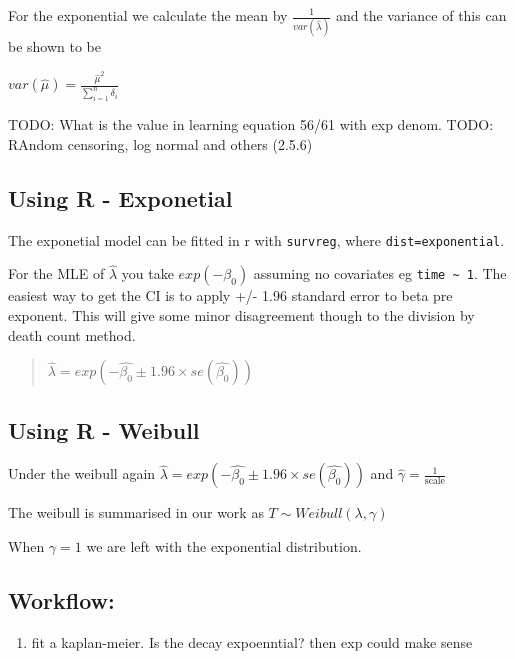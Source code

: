 \documentclass[
  letterpaper,
  DIV=11,
  numbers=noendperiod]{scrreprt}
\providecommand{\tightlist}{%
  \setlength{\itemsep}{0pt}\setlength{\parskip}{0pt}}\usepackage{longtable,booktabs,array}
\begin{document}
For the exponential we calculate the mean by
\(\frac{1}{var(\hat{\lambda})}\) and the variance of this can be shown
to be

\(var(\hat{\mu}) = \frac{\hat{\mu}^2}{\sum_{i=1}^n \delta_i}\)

TODO: What is the value in learning equation 56/61 with exp denom. TODO:
RAndom censoring, log normal and others (2.5.6)

\hypertarget{using-r---exponetial}{%
\subsection{Using R - Exponetial}\label{using-r---exponetial}}

The exponetial model can be fitted in r with \texttt{survreg}, where
\texttt{dist=\textquotesingle{}exponential\textquotesingle{}}.

For the MLE of \(\hat{\lambda}\) you take \(exp(-\beta_0)\) assuming no
covariates eg \texttt{time\ \textasciitilde{}\ 1}. The easiest way to
get the CI is to apply +/- 1.96 standard error to beta pre exponent.
This will give some minor disagreement though to the division by death
count method.

\begin{quote}
\(\hat{\lambda} = exp(-\hat{\beta_0} \pm 1.96\times se(\hat{\beta_0}))\)
\end{quote}

\hypertarget{using-r---weibull}{%
\subsection{Using R - Weibull}\label{using-r---weibull}}

Under the weibull again
\(\hat{\lambda} = exp(-\hat{\beta_0} \pm 1.96\times se(\hat{\beta_0}))\)
and \(\hat{\gamma} = \frac{1}{\text{scale}}\)

The weibull is summarised in our work as
\(T \sim Weibull(\lambda, \gamma)\)

When \(\gamma = 1\) we are left with the exponential distribution.

\hypertarget{workflow-1}{%
\subsection{Workflow:}\label{workflow-1}}

\begin{enumerate}
\def\labelenumi{\arabic{enumi}.}
\tightlist
\item
  fit a kaplan-meier. Is the decay expoenntial? then exp could make
  sense
\end{enumerate}
\end{document}
